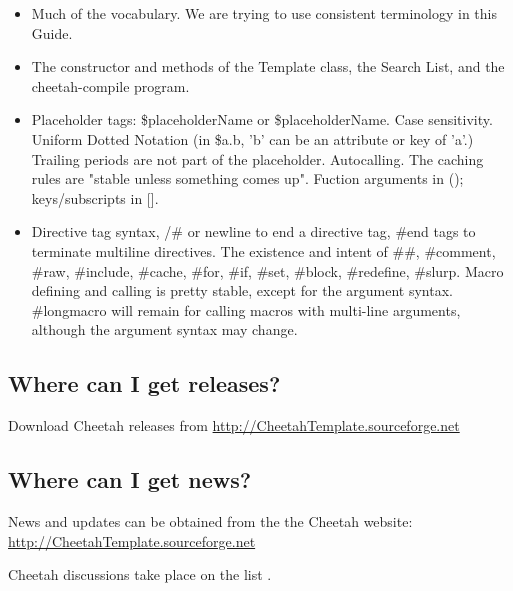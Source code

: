 \begin{itemize}

\item  Much of the vocabulary.  We are trying to use consistent terminology in
      this Guide.

\item  The constructor and methods of the Template class, the Search List, 
      and the cheetah-compile program.

\item  Placeholder tags:  \$placeholderName or \$placeholderName.  Case
      sensitivity.  Uniform Dotted Notation (in \$a.b, 'b' can be an attribute
      or key of 'a'.)  Trailing periods are not part of the placeholder.
      Autocalling.  The caching rules are "stable unless something comes up".
      Fuction arguments in (); keys/subscripts in [].

\item  Directive tag syntax, /# or newline to end a directive tag, #end tags 
      to terminate multiline directives.  The existence and intent of ##,
      #comment, #raw, #include, #cache, #for, #if, #set, #block, #redefine,
      #slurp.  Macro defining and calling is pretty stable, except for the
      argument syntax.  #longmacro will remain for calling macros with
      multi-line arguments, although the argument syntax may change.

\end{itemize}


\subsection{Where can I get releases?}
\label{intro.releases}

Download Cheetah releases from
\url{http://CheetahTemplate.sourceforge.net}

\subsection{Where can I get news?}
\label{intro.news}

News and updates can be obtained from the the Cheetah website:
\url{http://CheetahTemplate.sourceforge.net}

Cheetah discussions take place on the list
.

